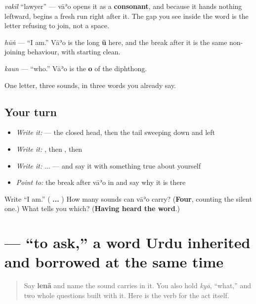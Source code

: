 \textbf{} \emph{vakīl} \textquotedblleft{}lawyer\textquotedblright{} — vāʾo opens it as a \textbf{consonant}, and because it hands nothing leftward, \textbf{} begins a fresh run right after it. The gap you see inside the word is the letter refusing to join, not a space.

\textbf{} \emph{hūṅ} — \textquotedblleft{}I am.\textquotedblright{} Vāʾo is the long \textbf{ū} here, and the break after it is the same non-joining behaviour, with \textbf{} starting clean.

\textbf{} \emph{kaun} — \textquotedblleft{}who.\textquotedblright{} Vāʾo is the \textbf{o} of the diphthong.

One letter, three sounds, in three words you already say.

\subsection*{Your turn}
\begin{itemize}
\raggedright
  \item \emph{Write it:}  — the closed head, then the tail sweeping down and left
  \item \emph{Write it:} , then , then 
  \item \emph{Write it:}  ...  — and say it with something true about yourself
  \item \emph{Point to:} the break after vāʾo in  and say why it is there
\end{itemize}

\begin{tcolorbox}[breakable,colback=teal!4,colframe=teal!35!black,title={Before you move on}]
Write \textquotedblleft{}I am.\textquotedblright{} (\textbf{ ... }) How many sounds can vāʾo carry? (\textbf{Four}, counting the silent one.) What tells you which? (\textbf{Having heard the word}.)
\end{tcolorbox}
\section[\texorpdfstring{\ur{پوچھنا} (pūchhnā)}{پوچھنا (pūchhnā)}]{ — “to ask,” a word Urdu inherited and borrowed at the same time}

\label{lesson:UR-C08-puchhna}



\begin{quote}
Say \textbf{lenā} and name the sound \textbf{} carries in it. You also hold \textbf{} \emph{kyā}, “what,” and two whole questions built with it. Here is the verb for the act itself.
\end{quote}

